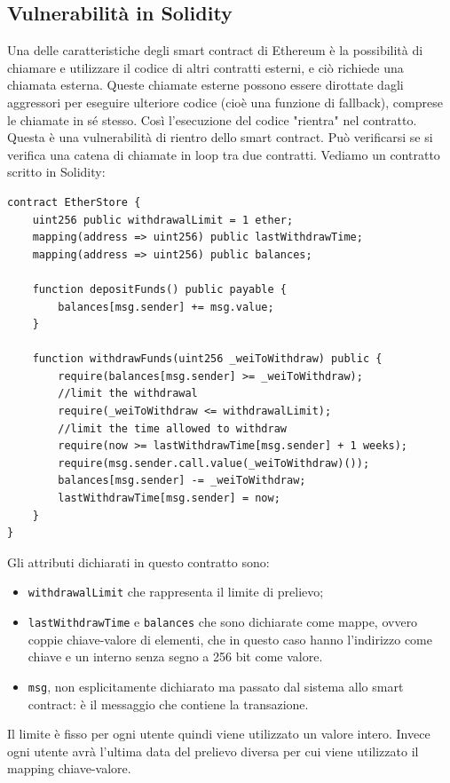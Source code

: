 \subsection{Vulnerabilità in Solidity}
Una delle caratteristiche degli smart contract di Ethereum è la possibilità di chiamare e utilizzare il codice di altri contratti esterni, e ciò richiede una chiamata esterna. Queste chiamate esterne possono essere dirottate dagli aggressori per eseguire ulteriore codice (cioè una funzione di fallback), comprese le chiamate in sé stesso. Così l'esecuzione del codice "rientra" nel contratto. Questa è una vulnerabilità di rientro dello smart contract. Può verificarsi se si verifica una catena di chiamate in loop tra due contratti. Vediamo un contratto scritto in Solidity:
\begin{lstlisting}[language=Solidity]
contract EtherStore {
    uint256 public withdrawalLimit = 1 ether;
    mapping(address => uint256) public lastWithdrawTime;
    mapping(address => uint256) public balances;
    
    function depositFunds() public payable {
        balances[msg.sender] += msg.value;
    }
    
    function withdrawFunds(uint256 _weiToWithdraw) public {
        require(balances[msg.sender] >= _weiToWithdraw);
        //limit the withdrawal
        require(_weiToWithdraw <= withdrawalLimit);
        //limit the time allowed to withdraw
        require(now >= lastWithdrawTime[msg.sender] + 1 weeks);
        require(msg.sender.call.value(_weiToWithdraw)());
        balances[msg.sender] -= _weiToWithdraw;
        lastWithdrawTime[msg.sender] = now;
    }
}
\end{lstlisting}
Gli attributi dichiarati in questo contratto sono:
\begin{itemize}
    \item \texttt{withdrawalLimit} che rappresenta il limite di prelievo;
    \item \texttt{lastWithdrawTime} e \texttt{balances} che sono dichiarate come mappe, ovvero coppie chiave-valore di elementi, che in questo caso hanno l'indirizzo come chiave e un interno senza segno a 256 bit come valore.
    \item \texttt{msg}, non esplicitamente dichiarato ma passato dal sistema allo smart contract: è il messaggio che contiene la transazione.
\end{itemize}
Il limite è fisso per ogni utente quindi viene utilizzato un valore intero. Invece ogni utente avrà l'ultima data del prelievo diversa per cui viene utilizzato il mapping chiave-valore.

